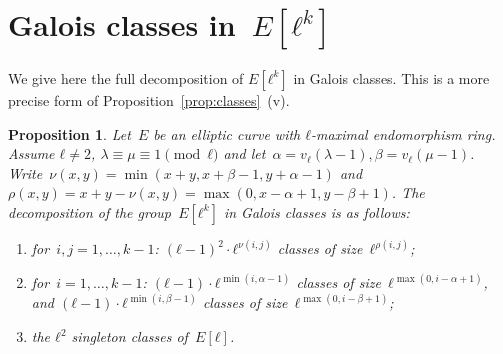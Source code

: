 \documentclass{lms}
\newcommand{\todo}[1]{{\color{red}TODO: #1}}
\newtheorem{prop}[thm]{Proposition}
\begin{document}
\goodbreak
\section{Galois classes in~$E[ℓ^k]$}
\label{ap:galois}

We give here the full decomposition of $E[ℓ^k]$ in Galois classes.
This is a more precise form of Proposition~\ref{prop:classes}~(v).
\begin{prop}\label{prop:orbites-l-torsion}
Let~$E$ be an elliptic curve with $ℓ$-maximal endomorphism ring.
Assume $ℓ ≠ 2$, $λ ≡ μ ≡ 1 \pmod{ℓ}$ and let~$α = v_ℓ(λ-1), β=v_ℓ(μ-1)$.
Write~$ν(x, y) = \min (x+y, x+β-1, y+α-1)$
and~$ρ(x, y) = x+y - ν(x, y) = \max (0, x-α+1, y-β+1)$.
The decomposition of the group~$E[ℓ^k]$ in Galois classes is as follows:
\begin{enumerate}
\item for~$i, j = 1, …, k-1$:
$(ℓ-1)^2 · ℓ^{ν(i,j)}$ classes of size~$ℓ^{ρ(i,j)}$;
\item for~$i = 1, …, k-1$:
$(ℓ-1) · ℓ^{\min (i, α-1)}$ classes of size~$ℓ^{\max (0, i-α+1)}$, and
$(ℓ-1) · ℓ^{\min (i, β-1)}$ classes of size~$ℓ^{\max (0, i-β+1)}$;
\item the $ℓ^2$ singleton classes of~$E[ℓ]$.
\end{enumerate}
\end{prop}
\end{document}

